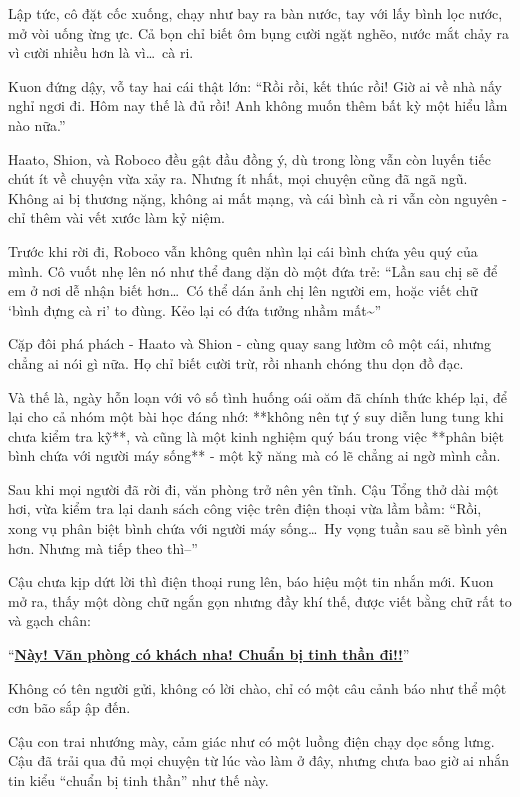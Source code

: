 \documentclass[../main.tex]{subfiles}
\begin{document}
Lập tức, cô đặt cốc xuống, chạy như bay ra bàn nước, tay với lấy bình lọc nước, mở vòi uống ừng ực. Cả bọn chỉ biết ôm bụng cười ngặt nghẽo, nước mắt chảy ra vì cười nhiều hơn là vì\dots\ cà ri.

Kuon đứng dậy, vỗ tay hai cái thật lớn: ``Rồi rồi, kết thúc rồi! Giờ ai về nhà nấy nghỉ ngơi đi. Hôm nay thế là đủ rồi! Anh không muốn thêm bất kỳ một hiểu lầm nào nữa.''

Haato, Shion, và Roboco đều gật đầu đồng ý, dù trong lòng vẫn còn luyến tiếc chút ít về chuyện vừa xảy ra. Nhưng ít nhất, mọi chuyện cũng đã ngã ngũ. Không ai bị thương nặng, không ai mất mạng, và cái bình cà ri vẫn còn nguyên - chỉ thêm vài vết xước làm kỷ niệm.

Trước khi rời đi, Roboco vẫn không quên nhìn lại cái bình chứa yêu quý của mình. Cô vuốt nhẹ lên nó như thể đang dặn dò một đứa trẻ: ``Lần sau chị sẽ để em ở nơi dễ nhận biết hơn\dots\ Có thể dán ảnh chị lên người em, hoặc viết chữ `bình đựng cà ri' to đùng. Kẻo lại có đứa tưởng nhầm mất\~{}''

Cặp đôi phá phách - Haato và Shion - cùng quay sang lườm cô một cái, nhưng chẳng ai nói gì nữa. Họ chỉ biết cười trừ, rồi nhanh chóng thu dọn đồ đạc.

Và thế là, ngày hỗn loạn với vô số tình huống oái oăm đã chính thức khép lại, để lại cho cả nhóm một bài học đáng nhớ: **không nên tự ý suy diễn lung tung khi chưa kiểm tra kỹ**, và cũng là một kinh nghiệm quý báu trong việc **phân biệt bình chứa với người máy sống** - một kỹ năng mà có lẽ chẳng ai ngờ mình cần.

\ct

Sau khi mọi người đã rời đi, văn phòng trở nên yên tĩnh. Cậu Tổng thở dài một hơi, vừa kiểm tra lại danh sách công việc trên điện thoại vừa lầm bầm: ``Rồi, xong vụ phân biệt bình chứa với người máy sống\dots\ Hy vọng tuần sau sẽ bình yên hơn. Nhưng mà tiếp theo thì--''

Cậu chưa kịp dứt lời thì điện thoại rung lên, báo hiệu một tin nhắn mới. Kuon mở ra, thấy một dòng chữ ngắn gọn nhưng đầy khí thế, được viết bằng chữ rất to và gạch chân:

\begin{center}
  ``\underline{\textbf{Này! Văn phòng có khách nha! Chuẩn bị tinh thần đi!!}}''
\end{center}

Không có tên người gửi, không có lời chào, chỉ có một câu cảnh báo như thể một cơn bão sắp ập đến.

Cậu con trai nhướng mày, cảm giác như có một luồng điện chạy dọc sống lưng. Cậu đã trải qua đủ mọi chuyện từ lúc vào làm ở đây, nhưng chưa bao giờ ai nhắn tin kiểu ``chuẩn bị tinh thần'' như thế này.
\end{document}
